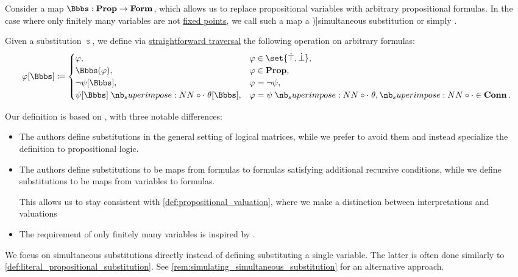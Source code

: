 \begin{definition}\label{def:propositional_substitution}\mimprovised
  Consider a map \( \Bbbs: \op*{Prop} \to \op*{Form} \), which allows us to replace propositional variables with arbitrary propositional formulas. In the case where only finitely many variables are not \hyperref[def:function_fixed_point]{fixed points}, we call such a map a \term[ru=одновременная замена (\cite[23]{Герасимов2011Вычислимость})]{simultaneous substitution} or simply .

  Given a substitution \( \Bbbs \), we define via \hyperref[rem:straightforward_traversal]{straightforward traversal} the following operation on arbitrary formulas:
  \begin{equation*}
    \varphi[\Bbbs] \coloneqq \begin{cases}
      \varphi,                            &\varphi \in \set{ \syntop, \synbot }, \\
      \Bbbs(\varphi),                     &\varphi \in \op*{Prop}, \\
      \neg \psi[\Bbbs],                   &\varphi = \neg \psi, \\
      \psi[\Bbbs] \syncirc \theta[\Bbbs], &\varphi = \psi \syncirc \theta, {\syncirc} \in \op*{Conn}. \\
    \end{cases}
  \end{equation*}
\end{definition}
\begin{comments}
  \item Our definition is based on , with three notable differences:
  \begin{itemize}
    \item The authors define substitutions in the general setting of logical matrices, while we prefer to avoid them and instead specialize the definition to propositional logic.

    \item The authors define substitutions to be maps from formulas to formulas satisfying additional recursive conditions, while we define substitutions to be maps from variables to formulas.

    This allows us to stay consistent with \cref{def:propositional_valuation}, where we make a distinction between interpretations and valuations

    \item The requirement of only finitely many variables is inspired by .
  \end{itemize}

  \item We focus on simultaneous substitutions directly instead of defining substituting a single variable. The latter is often done similarly to \cref{def:literal_propositional_substitution}. See \cref{rem:simulating_simultaneous_substitution} for an alternative approach.
\end{comments}

